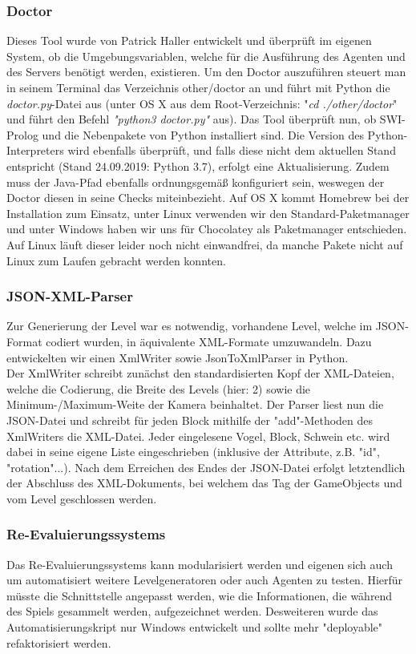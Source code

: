 \subsubsection{Doctor}
Dieses Tool wurde von Patrick Haller entwickelt und überprüft im eigenen System, ob die Umgebungsvariablen, welche für die Ausführung des Agenten und des Servers benötigt werden, existieren. Um den Doctor auszuführen steuert man in seinem Terminal das Verzeichnis other/doctor an und führt mit Python die \textit{doctor.py}-Datei aus (unter OS X aus dem Root-Verzeichnis: "\textit{cd ./other/doctor}" und führt den Befehl \textit{"python3 doctor.py"} aus). Das Tool überprüft nun, ob SWI-Prolog und die Nebenpakete von Python installiert sind. Die Version des Python-Interpreters wird ebenfalls überprüft, und falls diese nicht dem aktuellen Stand entspricht (Stand 24.09.2019: Python 3.7), erfolgt eine Aktualisierung.  Zudem muss der Java-Pfad ebenfalls ordnungsgemäß konfiguriert sein, weswegen der Doctor diesen in seine Checks miteinbezieht. Auf OS X kommt Homebrew bei der Installation zum Einsatz, unter Linux verwenden wir den Standard-Paketmanager und unter Windows haben wir uns für Chocolatey als Paketmanager entschieden. Auf Linux läuft dieser leider noch nicht einwandfrei, da manche Pakete nicht auf Linux zum Laufen gebracht werden konnten.
\subsubsection{JSON-XML-Parser}
Zur Generierung der Level war es notwendig, vorhandene Level, welche im JSON-Format codiert wurden, in äquivalente XML-Formate umzuwandeln. Dazu entwickelten wir einen XmlWriter sowie JsonToXmlParser in Python. \\ Der XmlWriter schreibt zunächst den standardisierten Kopf der XML-Dateien, welche die Codierung, die Breite des Levels (hier: 2) sowie die Minimum-/Maximum-Weite der Kamera beinhaltet. Der Parser liest nun die JSON-Datei und schreibt für jeden Block mithilfe der "add"-Methoden des XmlWriters die XML-Datei. Jeder eingelesene Vogel, Block, Schwein etc. wird dabei in seine eigene Liste eingeschrieben (inklusive der Attribute, z.B. "id", "rotation"...). Nach dem Erreichen des Endes der JSON-Datei erfolgt letztendlich der Abschluss des XML-Dokuments, bei welchem das Tag der GameObjects und vom Level geschlossen werden.

\subsubsection{Re-Evaluierungssystems}
Das Re-Evaluierungssystems kann modularisiert werden und eigenen sich auch um automatisiert weitere Levelgeneratoren oder auch Agenten zu testen. Hierfür müsste die Schnittstelle angepasst werden, wie die Informationen, die während des Spiels gesammelt werden, aufgezeichnet werden. 
Desweiteren wurde das Automatisierungskript nur Windows entwickelt und sollte mehr "deployable" refaktorisiert werden.